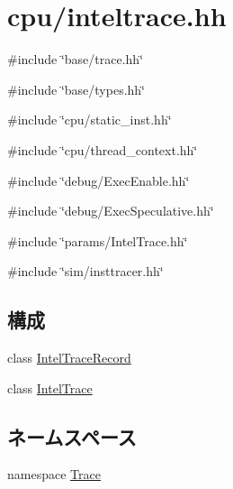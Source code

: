 \hypertarget{inteltrace_8hh}{
\section{cpu/inteltrace.hh}
\label{inteltrace_8hh}
}
{\ttfamily \#include \char`\"{}base/trace.hh\char`\"{}}\par
{\ttfamily \#include \char`\"{}base/types.hh\char`\"{}}\par
{\ttfamily \#include \char`\"{}cpu/static\_\-inst.hh\char`\"{}}\par
{\ttfamily \#include \char`\"{}cpu/thread\_\-context.hh\char`\"{}}\par
{\ttfamily \#include \char`\"{}debug/ExecEnable.hh\char`\"{}}\par
{\ttfamily \#include \char`\"{}debug/ExecSpeculative.hh\char`\"{}}\par
{\ttfamily \#include \char`\"{}params/IntelTrace.hh\char`\"{}}\par
{\ttfamily \#include \char`\"{}sim/insttracer.hh\char`\"{}}\par
\subsection*{構成}
\begin{DoxyCompactItemize}
\item 
class \hyperlink{classTrace_1_1IntelTraceRecord}{IntelTraceRecord}
\item 
class \hyperlink{classTrace_1_1IntelTrace}{IntelTrace}
\end{DoxyCompactItemize}
\subsection*{ネームスペース}
\begin{DoxyCompactItemize}
\item 
namespace \hyperlink{namespaceTrace}{Trace}
\end{DoxyCompactItemize}
